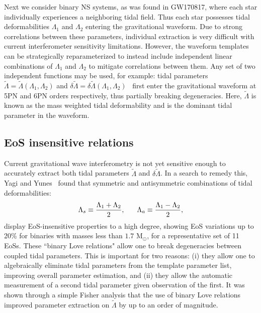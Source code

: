 \documentclass[prd,twocolumn,nofootinbib,superscriptaddress,amsmath,amssymb]{revtex4-1}
\begin{document}
Next we consider binary NS systems, as was found in GW170817, where each star individually experiences a neighboring tidal field.
Thus each star possesses tidal deformabilities $\Lambda_1$ and $\Lambda_2$ entering the gravitational waveform.
Due to strong correlations between these parameters, individual extraction is very difficult with current interferometer sensitivity limitations.
However, the waveform templates can be strategically reparameterized to instead include independent linear combinations of $\Lambda_1$ and $\Lambda_2$ to mitigate correlations between them. 
Any set of two independent functions may be used, for example: tidal parameters $\tilde{\Lambda}=\tilde{\Lambda}(\Lambda_1,\Lambda_2)$ and $\delta \tilde{\Lambda}=\delta \tilde{\Lambda}(\Lambda_1,\Lambda_2)$~\cite{Wade:tidalCorrections} first enter the gravitational waveform at 5PN and 6PN orders respectively, thus partially breaking degeneracies.
Here, $\tilde{\Lambda}$ is known as the mass weighted tidal deformability and is the dominant tidal parameter in the waveform. 

\subsection{EoS insensitive relations}\label{sec:eosInsensitive}
Current gravitational wave interferometry is not yet sensitive enough to accurately extract both tidal parameters $\tilde{\Lambda}$ and $\delta\tilde{\Lambda}$.
In a search to remedy this, Yagi and Yunes~\cite{Yagi:binLove} found that symmetric and antisymmetric combinations of tidal deformabilities:
\begin{equation}
\Lambda_s \equiv \frac{\Lambda_1 + \Lambda_2}{2}, \hspace{6mm} \Lambda_a \equiv \frac{\Lambda_1 - \Lambda_2}{2},
\end{equation}
display EoS-insensitive properties to a high degree, showing EoS variations up to 20\% for binaries with masses less than $1.7 \text{ M}_{\odot}$, for a representative set of 11 EoSs. 
These ``binary Love relations" allow one to break degeneracies between coupled tidal parameters.
This is important for two reasons: (i) they allow one to algebraically eliminate tidal parameters from the template parameter list, improving overall parameter estimation, and (ii) they allow the automatic measurement of a second tidal parameter given observation of the first.
It was shown through a simple Fisher analysis that the use of binary Love relations improved parameter extraction on $\tilde{\Lambda}$ by up to an order of magnitude.
\end{document}
